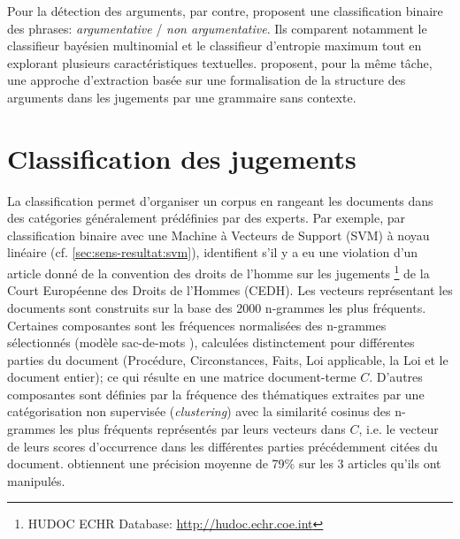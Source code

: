  Pour la détection des arguments, par contre, \citet{moens2007NBvsMaxent4arguments} proposent une classification binaire des phrases: \textit{argumentative} / \textit{non argumentative}. Ils comparent notamment le classifieur bayésien multinomial et le classifieur d'entropie maximum tout en explorant plusieurs caractéristiques textuelles. \citet{mochales2008contextfreegrammararg} proposent, pour la même tâche, une approche d'extraction basée sur une formalisation de la structure des arguments dans les jugements par une grammaire sans contexte. 


\section{Classification des jugements}
La classification permet d'organiser un corpus en rangeant les documents dans des catégories généralement prédéfinies par des experts. Par exemple, par classification binaire avec une Machine à Vecteurs de Support (SVM) \citep{vapnik1995statlearning} à noyau linéaire (cf. \ref{sec:sens-resultat:svm}),  \citet{Aletras2016predictDecisionECHR} identifient s'il y a eu une violation d'un article donné de la convention des droits de l'homme sur les jugements \footnote{HUDOC ECHR Database: \url{http://hudoc.echr.coe.int}} de la Court Européenne des Droits de l'Hommes (CEDH). Les vecteurs représentant les documents sont construits sur la base des 2000 n-grammes les plus fréquents. Certaines composantes  sont les fréquences normalisées des n-grammes sélectionnés (modèle sac-de-mots \citep{salton1975BoW, salton1983modernIR_BoW}), calculées distinctement pour différentes parties du document (Procédure, Circonstances, Faits, Loi applicable, la Loi et le document entier); ce qui résulte en une matrice document-terme $C$. D'autres composantes sont définies par la fréquence des thématiques extraites par une catégorisation non supervisée (\textit{clustering}) avec la similarité cosinus des n-grammes les plus fréquents représentés par leurs vecteurs dans $C$, i.e. le vecteur de leurs scores d'occurrence dans les différentes parties précédemment citées du document. \citet{Aletras2016predictDecisionECHR} obtiennent une précision moyenne de 79\% sur les 3 articles qu'ils ont manipulés. 
